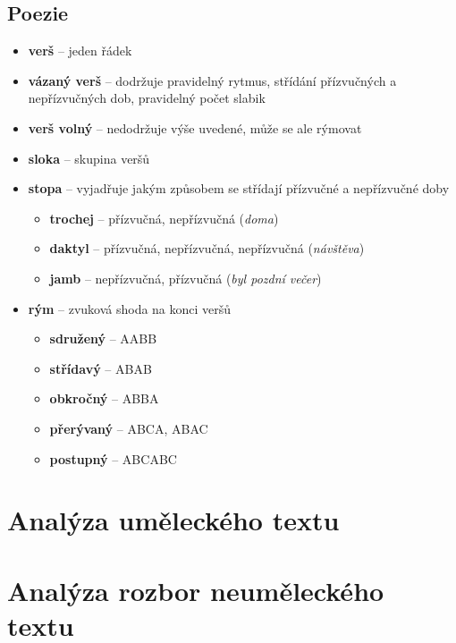 \documentclass[10pt,a4paper]{article}
\begin{document}
\subsection{Poezie}
\begin{itemize}
\item[] \textbf{verš} -- jeden řádek
\item[] \textbf{vázaný verš} -- dodržuje pravidelný rytmus, střídání přízvučných a nepřízvučných dob, pravidelný počet slabik
\item[] \textbf{verš volný} -- nedodržuje výše uvedené, může se ale rýmovat
\item[] \textbf{sloka} -- skupina veršů
\item[] \textbf{stopa} -- vyjadřuje jakým způsobem se střídají přízvučné a nepřízvučné doby
\begin{itemize}
\item \textbf{trochej} -- přízvučná, nepřízvučná (\textit{doma})
\item \textbf{daktyl} -- přízvučná, nepřízvučná, nepřízvučná (\textit{návštěva})
\item \textbf{jamb} -- nepřízvučná, přízvučná (\textit{byl pozdní večer})
\end{itemize}
\item[] \textbf{rým} -- zvuková shoda na konci veršů
\begin{itemize}
\item \textbf{sdružený} -- AABB
\item \textbf{střídavý} -- ABAB
\item \textbf{obkročný} -- ABBA
\item \textbf{přerývaný} -- ABCA, ABAC
\item \textbf{postupný} -- ABCABC

\end{itemize}
\end{itemize}

\newpage
\section{Analýza uměleckého textu}

\section{Analýza rozbor neuměleckého textu}
\end{document}
